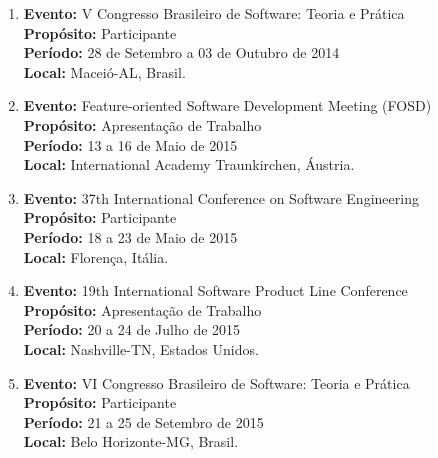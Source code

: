 \documentclass[a4paper,oneside,10pt]{article}
\begin{document}
\begin{enumerate}
\renewcommand{\labelenumi}{{\large\bfseries\arabic{enumi}.}}

\item   \textbf{Evento:} V Congresso Brasileiro de Software: Teoria e Prática \mbox{} \\
        \textbf{Propósito:} Participante\\
        \textbf{Período:} 28 de Setembro a 03 de Outubro de 2014\\
        \textbf{Local:} Maceió-AL, Brasil.

\item   \textbf{Evento:} Feature-oriented Software Development Meeting (FOSD) \mbox{} \\
        \textbf{Propósito:} Apresentação de Trabalho\\
        \textbf{Período:} 13 a 16 de Maio de 2015\\
        \textbf{Local:} International Academy Traunkirchen, Áustria.

\item   \textbf{Evento:} 37th International Conference on Software Engineering \mbox{} \\
        \textbf{Propósito:} Participante\\
        \textbf{Período:} 18 a 23 de Maio de 2015\\
        \textbf{Local:} Florença, Itália.

\item   \textbf{Evento:} 19th International Software Product Line Conference
 \mbox{} \\
        \textbf{Propósito:} Apresentação de Trabalho\\
        \textbf{Período:} 20 a 24 de Julho de 2015\\
        \textbf{Local:} Nashville-TN, Estados Unidos.

\item   \textbf{Evento:} VI Congresso Brasileiro de Software: Teoria e Prática \mbox{} \\
        \textbf{Propósito:} Participante\\
        \textbf{Período:} 21 a 25 de Setembro de 2015\\
        \textbf{Local:} Belo Horizonte-MG, Brasil.


\end{enumerate}
\end{document}
